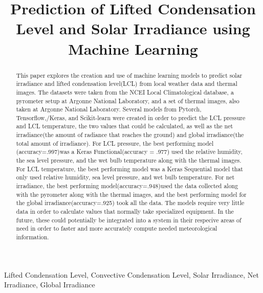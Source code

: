 \documentclass[conference]{IEEEtran}
\begin{document}
\title{Prediction of Lifted Condensation Level and Solar Irradiance using Machine Learning\\

}

\author{
}

\maketitle

\begin{abstract}
This paper explores the creation and use of machine learning models to predict solar irradiance and lifted condensation level(LCL) from local weather data and thermal images. The datasets were taken from the NCEI Local Climatological database, a pyrometer setup at Argonne National Laboratory, and a set of thermal images, also taken at Argonne National Laboratory. Several models from Pytorch, Tensorflow,/Keras, and Scikit-learn were created in order to predict the LCL pressure and LCL temperature, the two values that could be calculated, as well as the net irradiance(the amount of radiance that reaches the ground) and global irradiance(the total amount of irradiance). For LCL pressure, the best performing model (accuracy=.997)was a Keras Functional(accuracy = .977) used the relative humidity, the sea level pressure, and the wet bulb temperature along with the thermal images. For LCL temperature, the best performing model was a Keras Sequential model that only used relative humidity, sea level pressure, and wet bulb temperature. For net irradiance, the best performing model(accuracy=.948)used the data collected along with the pyrometer along with the thermal images, and the best performing model for the global irradiance(accuracy=.925) took all the data. The models require very little data in order to calculate values that normally take specialized equipment. In the future, these could potentially be integrated into a system in their respecive areas of need in order to faster and more accurately compute needed meteorological information.
\end{abstract}

\begin{IEEEkeywords}
Lifted Condensation Level, Convective Condensation Level, Solar Irradiance, Net Irradiance, Global Irradiance
\end{IEEEkeywords}
\end{document}
